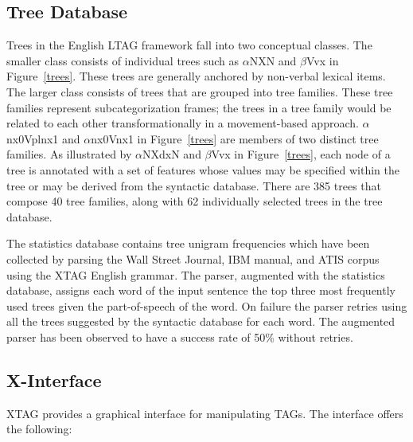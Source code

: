 \subsection{Tree Database} 
\label{tree-db}
Trees in the English LTAG framework fall into two conceptual classes.
The smaller class consists of individual trees such as $\alpha$NXN and
$\beta$Vvx in Figure~\ref{trees}. These trees are generally anchored by
non-verbal lexical items. The larger class consists of trees that are
grouped into tree families.  These tree families represent
subcategorization frames; the trees in a tree family would be related
to each other transformationally in a movement-based approach.
$\alpha$nx0Vplnx1 and $\alpha$nx0Vnx1 in Figure~\ref{trees} are
members of two distinct tree families.  As illustrated by
$\alpha$NXdxN and $\beta$Vvx in Figure~\ref{trees}, each node of a
tree is annotated with a set of features whose values may be specified
within the tree or may be derived from the syntactic database.  There
are 385 trees that compose 40 tree families, along with 62
individually selected trees in the tree database.


\label{stat-db}
The statistics database contains tree unigram frequencies which have been
collected by parsing the Wall Street Journal, IBM manual, and ATIS corpus using
the XTAG English grammar. The parser, augmented with the statistics database,
assigns each word of the input sentence the top three most frequently used
trees given the part-of-speech of the word. On failure the parser retries using
all the trees suggested by the syntactic database for each word.  The augmented
parser has been observed to have a success rate of 50\% without retries.

\subsection{X-Interface}

XTAG provides a graphical interface for manipulating TAGs.  The interface
offers the following:

